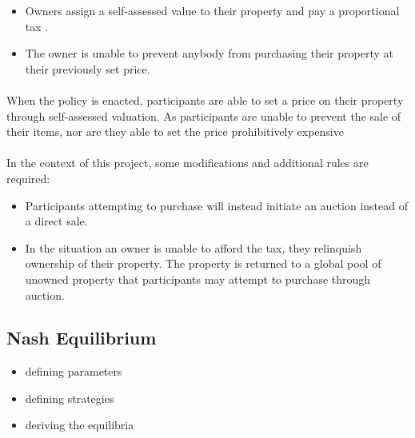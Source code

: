 \begin{itemize}
  \item Owners assign a self-assessed value to their property and pay a proportional tax .
  \item The owner is unable to prevent anybody from purchasing their property at their previously set price.
\end{itemize}

\paragraph{} When the policy is enacted, participants are able to set a price on their property through self-assessed valuation. As participants are unable to prevent the sale of their items, nor are they able to set the price prohibitively expensive

\paragraph{} In the context of this project, some modifications and additional rules are required:

\begin{itemize}
  \item Participants attempting to purchase will instead initiate an auction instead of a direct sale.
  \item In the situation an owner is unable to afford the tax, they relinquish ownership of their property. The property is returned to a global pool of unowned property that participants may attempt to purchase through auction.
\end{itemize}

\subsection{Nash Equilibrium}

\begin{itemize}
  \item defining parameters
  \item defining strategies
  \item deriving the equilibria
\end{itemize}